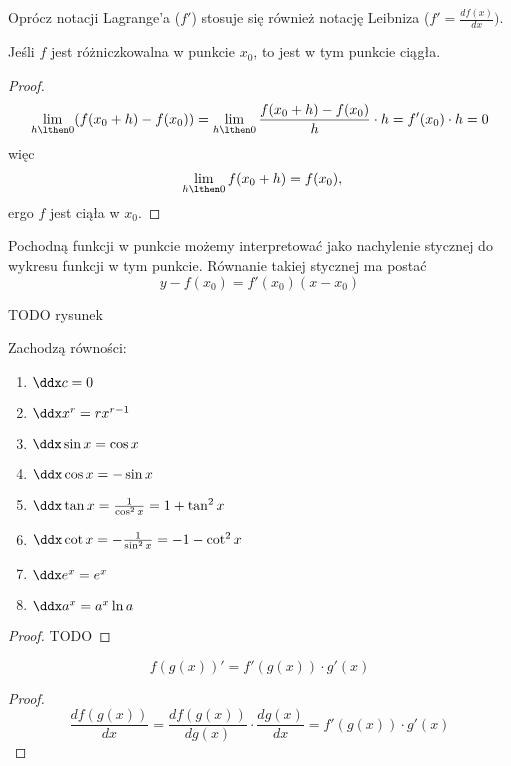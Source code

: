 \documentclass[11pt]{scrartcl}
\begin{document}
    Oprócz notacji Lagrange'a ($f'$) stosuje się również notację Leibniza ($f' = \frac{df(x)}{dx})$.

    \begin{theorem}
        Jeśli $f$ jest różniczkowalna w punkcie $x_0$, to jest w tym punkcie ciągła.
    \end{theorem}
    \begin{proof}
        \[ \lim_{h \lthen 0}(f(x_0 + h) - f(x_0)) = \lim_{h \lthen 0}\frac{f(x_0 + h) - f(x_0)}{h} \cdot h = f'(x_0) \cdot h = 0 \]
        więc
        \[\ \lim_{h\lthen 0}f(x_0 + h) = f(x_0), \]
        ergo $f$ jest ciąła w $x_0$.
    \end{proof}

    Pochodną funkcji w punkcie możemy interpretować jako nachylenie stycznej do wykresu funkcji w tym punkcie. Równanie takiej stycznej ma postać
    \begin{equation}
        y - f(x_0) = f'(x_0)(x - x_0)
    \end{equation}

    TODO rysunek

    \begin{theorem}
        Zachodzą równości:
        \begin{enumerate}
            \item $\ddx c = 0$
            \item $\ddx x^r = rx^{r-1}$
            \item $\ddx \sin x = \cos x$
            \item $\ddx \cos x = -\sin x$
            \item $\ddx \tan x = \frac{1}{\cos^2 x} = 1 + \tan^2 x$
            \item $\ddx \cot x = - \frac{1}{\sin^2 x} = -1 - \cot^2 x$
            \item $\ddx e^x = e^x$
            \item $\ddx a^x = a^x \ln a$
        \end{enumerate}
    \end{theorem}
    \begin{proof}
        TODO
    \end{proof}

    \begin{theorem}
        \[ f(g(x))' = f'(g(x)) \cdot g'(x) \]
    \end{theorem}
    \begin{proof}
        \[ \frac{df(g(x))}{dx} = \frac{df(g(x))}{dg(x)}\cdot\frac{dg(x)}{dx} = f'(g(x)) \cdot g'(x) \]
    \end{proof}
\end{document}
